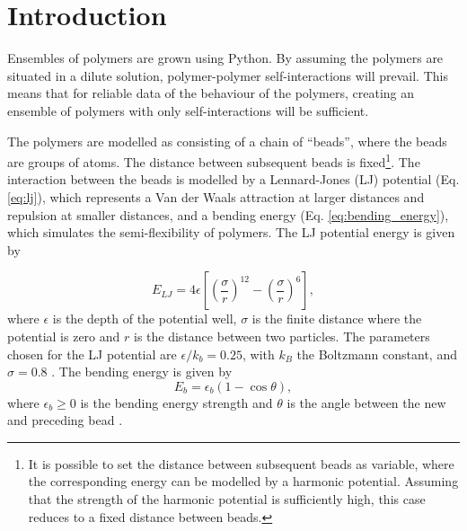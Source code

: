 \section{Introduction}
Ensembles of polymers are grown using Python. By assuming the polymers are situated in a dilute solution, polymer-polymer self-interactions will prevail. This means that for reliable data of the behaviour of the polymers, creating an ensemble of polymers with only self-interactions will be sufficient. 

The polymers are modelled as consisting of a chain of ``beads'', where the beads are groups of atoms. The distance between subsequent beads is fixed\footnote{It is possible to set the distance between subsequent beads as variable, where the corresponding energy can be modelled by a harmonic potential. Assuming that the strength of the harmonic potential is sufficiently high, this case reduces to a fixed distance between beads.}. The interaction between the beads is modelled by a Lennard-Jones (LJ) potential (Eq. \ref{eq:lj}), which represents a Van der Waals attraction at larger distances and repulsion at smaller distances, and a bending energy (Eq. \ref{eq:bending_energy}), which simulates the semi-flexibility of polymers. The LJ potential energy is given by 

\begin{equation}\label{eq:lj}
   E_{LJ} = 4\epsilon \left[ \left(\frac{\sigma}{r}\right)^{12} - \left(\frac{\sigma}{r}\right)^{6} \right],
\end{equation} where $\epsilon$ is the depth of the potential well, $\sigma$ is the finite distance where the potential is zero and $r$ is the distance between two particles. The parameters chosen for the LJ potential are $\epsilon/k_b=0.25$, with $k_B$ the Boltzmann constant, and $\sigma=0.8$ \cite{jmt}. The bending energy is given by
\begin{equation}\label{eq:bending_energy}
    E_{b} = \epsilon_b(1-\cos{\theta}),
\end{equation} where $\epsilon_b\geq 0$ is the bending energy strength and $\theta$ is the angle between the new and preceding bead \cite{hsu2011review}.

